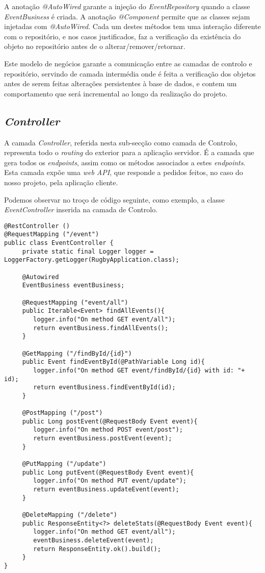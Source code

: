 A anotação \emph{@AutoWired} garante a injeção do \emph{EventRepository} quando a classe \emph{EventBusiness} é criada. A anotação \emph{@Component} permite que as classes sejam injetadas com \emph{@AutoWired}. Cada um destes métodos tem uma interação diferente com o repositório, e nos casos justificados, faz a verificação da existência do objeto no repositório antes de o alterar/remover/retornar.

Este modelo de negócios garante a comunicação entre as camadas de controlo e repositório, servindo de camada intermédia onde é feita a verificação dos objetos antes de serem feitas alterações persistentes à base de dados, e contem um comportamento que será incremental ao longo da realização do projeto.

\subsection{\emph{Controller}} \label{sec314}
A camada \emph{Controller}, referida nesta sub-secção como camada de Controlo, representa todo o \emph{routing} do exterior para a aplicação servidor. É a camada que gera todos os \emph{endpoints}, assim como os métodos associados a estes \emph{endpoints}. Esta camada expõe uma \textit{web API}, que responde a pedidos feitos, no caso do nosso projeto, pela aplicação cliente.

Podemos observar no troço de código seguinte, como exemplo, a classe \emph{EventController} inserida na camada de Controlo.

\begin{lstlisting}
@RestController ()
@RequestMapping ("/event")
public class EventController {
	 private static final Logger logger = LoggerFactory.getLogger(RugbyApplication.class);
	
	 @Autowired
	 EventBusiness eventBusiness;
	
	 @RequestMapping ("event/all")
	 public Iterable<Event> findAllEvents(){
	 	logger.info("On method GET event/all");
	 	return eventBusiness.findAllEvents();
	 }
	
	 @GetMapping ("/findById/{id}")
	 public Event findEventById(@PathVariable Long id){
	 	logger.info("On method GET event/findById/{id} with id: "+ id);
	 	return eventBusiness.findEventById(id);
	 }
	
	 @PostMapping ("/post")
	 public Long postEvent(@RequestBody Event event){
	 	logger.info("On method POST event/post");
	 	return eventBusiness.postEvent(event);
	 }
	
	 @PutMapping ("/update")
	 public Long putEvent(@RequestBody Event event){
	 	logger.info("On method PUT event/update");
	 	return eventBusiness.updateEvent(event);
	 }
	
	 @DeleteMapping ("/delete")
	 public ResponseEntity<?> deleteStats(@RequestBody Event event){
	 	logger.info("On method GET event/all");
	 	eventBusiness.deleteEvent(event);
	 	return ResponseEntity.ok().build();
	 }
}
\end{lstlisting}


